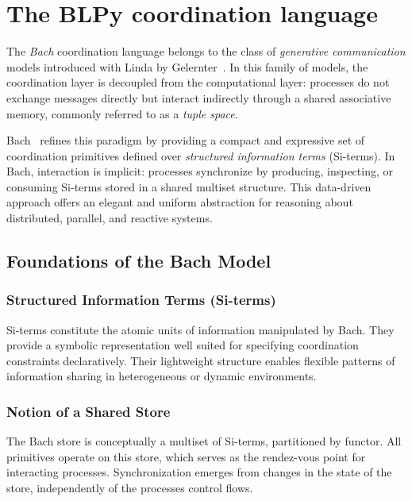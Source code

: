 \section{The BLPy coordination language}

The \emph{Bach} coordination language belongs to the class of \emph{generative communication} models introduced with Linda by Gelernter~\cite{gelernter1985generative}. In this family of models, the coordination layer is decoupled from the computational layer: processes do not exchange messages directly but interact indirectly through a shared associative memory, commonly referred to as a \emph{tuple space}.

Bach~\cite{jacquet2007coordinating} refines this paradigm by providing a compact and expressive set of coordination primitives defined over \emph{structured information terms} (Si-terms). In Bach, interaction is implicit: processes synchronize by producing, inspecting, or consuming Si-terms stored in a shared multiset structure. This data-driven approach offers an elegant and uniform abstraction for reasoning about distributed, parallel, and reactive systems.

\subsection{Foundations of the Bach Model}

\subsubsection{Structured Information Terms (Si-terms)}
Si-terms constitute the atomic units of information manipulated by Bach. They provide a symbolic representation well suited for specifying coordination constraints declaratively. Their lightweight structure enables flexible patterns of information sharing
in heterogeneous or dynamic environments.

\subsubsection{Notion of a Shared Store}

The Bach store is conceptually a multiset of Si-terms, partitioned by functor. All primitives operate on this store, which serves as the rendez-vous point for interacting processes. Synchronization emerges from changes in the state of the store, independently of the processes control flows.

